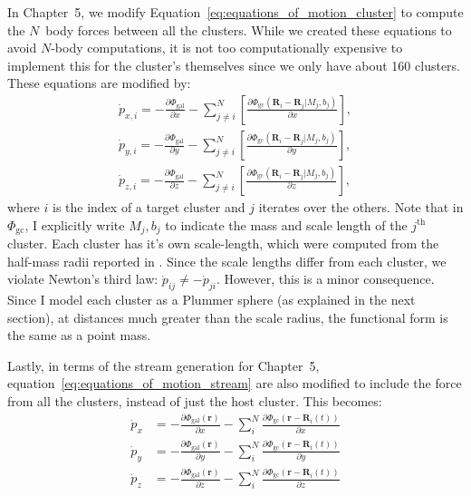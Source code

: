         In Chapter~5, we modify Equation~\ref{eq:equations_of_motion_cluster} to compute the $N$~body forces between all the clusters. While we created these equations to avoid $N$-body computations, it is not too computationally expensive to implement this for the cluster's themselves since we only have about 160 clusters. These equations are modified by:  
        \begin{align}\label{eq:equations_of_motion_cluster_n_body}
            \dot{p}_{x,i} = - \frac{\partial \Phi_\mathrm{gal}}{\partial x} - \sum_{j\neq i}^N \left[\frac{\partial \Phi_\mathrm{gc}\left(\mathbf{R}_i-\mathbf{R}_j|M_j,b_j\right)}{\partial x}\right], \\ 
            \dot{p}_{y,i} = - \frac{\partial \Phi_\mathrm{gal}}{\partial y} - \sum_{j\neq i}^N \left[\frac{\partial \Phi_\mathrm{gc}\left(\mathbf{R}_i-\mathbf{R}_j|M_j,b_j\right)}{\partial y}\right], \\ 
            \dot{p}_{z,i} = - \frac{\partial \Phi_\mathrm{gal}}{\partial z} - \sum_{j\neq i}^N \left[\frac{\partial \Phi_\mathrm{gc}\left(\mathbf{R}_i-\mathbf{R}_j|M_j,b_j\right)}{\partial z}\right],
        \end{align}
        where $i$ is the index of a target cluster and $j$ iterates over the others. Note that in $\Phi_{\mathrm{gc}}$, I explicitly write $M_j,b_j$ to indicate the mass and scale length of the $j^{\mathrm{th}}$ cluster. Each cluster has it's own scale-length, which were computed from the half-mass radii reported in \citet{2018MNRAS.478.1520B}. Since the scale lengths differ from each cluster, we violate Newton's third law: $\dot{p}_{ij} \neq - \dot{p}_{ji}$. However, this is a minor consequence. Since I model each cluster as a Plummer sphere (as explained in the next section), at distances much greater than the scale radius, the functional form is the same as a point mass. 

        Lastly, in terms of the stream generation for Chapter~5, equation~\ref{eq:equations_of_motion_stream} are also modified to include the force from all the clusters, instead of just the host cluster. This becomes: 
        \begin{align}
            \dot{p}_{x} &= -\frac{\partial \Phi_\mathrm{gal}\left(\mathbf{r}\right)}{\partial x} - \sum_i^N \frac{\partial \Phi_\mathrm{gc}\left(\mathbf{r} - \mathbf{R}_i(t)\right)}{\partial x}\\
            \dot{p}_{y} &= -\frac{\partial \Phi_\mathrm{gal}\left(\mathbf{r}\right)}{\partial y} - \sum_i^N \frac{\partial \Phi_\mathrm{gc}\left(\mathbf{r} - \mathbf{R}_i(t)\right)}{\partial y}\\
            \dot{p}_{z} &= -\frac{\partial \Phi_\mathrm{gal}\left(\mathbf{r}\right)}{\partial z} - \sum_i^N \frac{\partial \Phi_\mathrm{gc}\left(\mathbf{r} - \mathbf{R}_i(t)\right)}{\partial z}
        \end{align}

